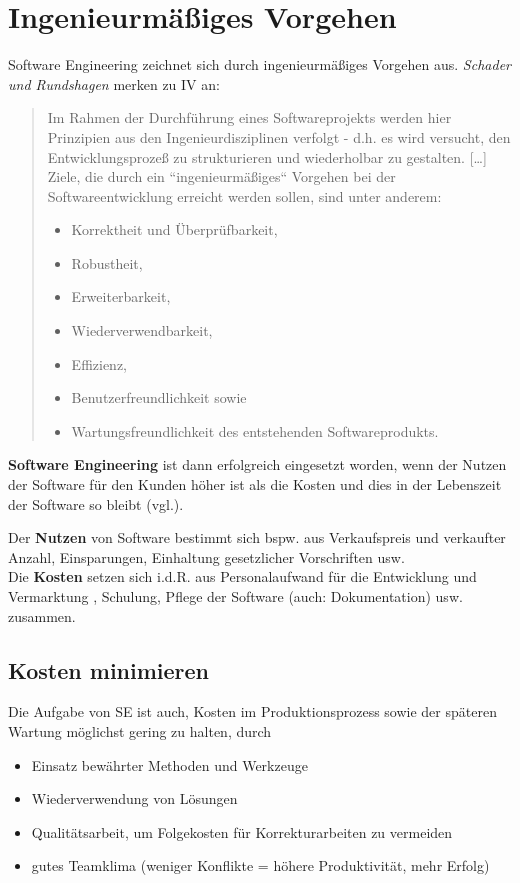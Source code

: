 \section{Ingenieurmäßiges Vorgehen}

Software Engineering zeichnet sich durch ingenieurmäßiges Vorgehen aus.
\textit{Schader und Rundshagen} merken zu IV an:

\blockquote[{\cite[2]{SR94}}]{
    Im
    Rahmen der Durchführung eines Softwareprojekts werden hier Prinzipien aus den Ingenieurdisziplinen verfolgt - d.h. es wird versucht, den
    Entwicklungsprozeß zu strukturieren und wiederholbar zu gestalten.
    [\ldots]
    Ziele, die durch ein ``ingenieurmäßiges`` Vorgehen bei der Softwareentwicklung erreicht werden sollen, sind unter anderem:
    \begin{itemize}
        \item Korrektheit und Überprüfbarkeit,
        \item  Robustheit,
        \item  Erweiterbarkeit,
        \item  Wiederverwendbarkeit,
        \item  Effizienz,
        \item  Benutzerfreundlichkeit sowie
        \item  Wartungsfreundlichkeit des entstehenden Softwareprodukts.
    \end{itemize}

}

\begin{tcolorbox}
    \textbf{Software Engineering} ist dann erfolgreich eingesetzt worden, wenn der Nutzen der Software für den Kunden höher ist als die Kosten und dies in der Lebenszeit der Software so bleibt (vgl.\cite[5]{Wed09}).
\end{tcolorbox}

\noindent
Der \textbf{Nutzen} von Software bestimmt sich bspw. aus Verkaufspreis und verkaufter Anzahl, Einsparungen, Einhaltung gesetzlicher Vorschriften usw.\\

\noindent
Die \textbf{Kosten} setzen sich i.d.R. aus Personalaufwand für die Entwicklung und Vermarktung , Schulung, Pflege der Software (auch: Dokumentation) usw. zusammen.\\

\subsection*{Kosten minimieren}
Die Aufgabe von SE ist auch, Kosten im Produktionsprozess sowie der späteren Wartung möglichst gering zu halten, durch
\begin{itemize}
    \item Einsatz bewährter Methoden und Werkzeuge
    \item Wiederverwendung von Lösungen
    \item Qualitätsarbeit, um Folgekosten für Korrekturarbeiten zu vermeiden
    \item gutes Teamklima (weniger Konflikte = höhere Produktivität, mehr Erfolg)
\end{itemize}

